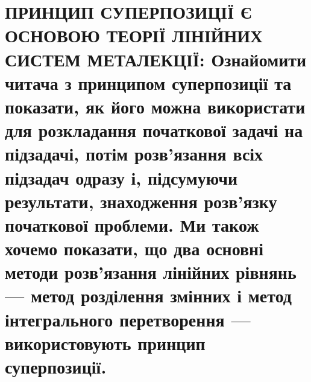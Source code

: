 \documentclass[
  ukrainian,
]{article}
\begin{document}
\section{ПРИНЦИП СУПЕРПОЗИЦІЇ Є ОСНОВОЮ ТЕОРІЇ ЛІНІЙНИХ СИСТЕМ
МЕТАЛЕКЦІЇ: Ознайомити читача з принципом суперпозиції та показати, як
його можна використати для розкладання початкової задачі на підзадачі,
потім розв'язання всіх підзадач одразу і, підсумуючи результати,
знаходження розв'язку початкової проблеми. Ми також хочемо показати, що
два основні методи розв'язання лінійних рівнянь --- метод розділення
змінних і метод інтегрального перетворення --- використовують принцип
суперпозиції.}\label{ux43fux440ux438ux43dux446ux438ux43f-ux441ux443ux43fux435ux440ux43fux43eux437ux438ux446ux456ux457-ux454-ux43eux441ux43dux43eux432ux43eux44e-ux442ux435ux43eux440ux456ux457-ux43bux456ux43dux456ux439ux43dux438ux445-ux441ux438ux441ux442ux435ux43c-ux43cux435ux442ux430ux43bux435ux43aux446ux456ux457-ux43eux437ux43dux430ux439ux43eux43cux438ux442ux438-ux447ux438ux442ux430ux447ux430-ux437-ux43fux440ux438ux43dux446ux438ux43fux43eux43c-ux441ux443ux43fux435ux440ux43fux43eux437ux438ux446ux456ux457-ux442ux430-ux43fux43eux43aux430ux437ux430ux442ux438-ux44fux43a-ux439ux43eux433ux43e-ux43cux43eux436ux43dux430-ux432ux438ux43aux43eux440ux438ux441ux442ux430ux442ux438-ux434ux43bux44f-ux440ux43eux437ux43aux43bux430ux434ux430ux43dux43dux44f-ux43fux43eux447ux430ux442ux43aux43eux432ux43eux457-ux437ux430ux434ux430ux447ux456-ux43dux430-ux43fux456ux434ux437ux430ux434ux430ux447ux456-ux43fux43eux442ux456ux43c-ux440ux43eux437ux432ux44fux437ux430ux43dux43dux44f-ux432ux441ux456ux445-ux43fux456ux434ux437ux430ux434ux430ux447-ux43eux434ux440ux430ux437ux443-ux456-ux43fux456ux434ux441ux443ux43cux443ux44eux447ux438-ux440ux435ux437ux443ux43bux44cux442ux430ux442ux438-ux437ux43dux430ux445ux43eux434ux436ux435ux43dux43dux44f-ux440ux43eux437ux432ux44fux437ux43aux443-ux43fux43eux447ux430ux442ux43aux43eux432ux43eux457-ux43fux440ux43eux431ux43bux435ux43cux438.-ux43cux438-ux442ux430ux43aux43eux436-ux445ux43eux447ux435ux43cux43e-ux43fux43eux43aux430ux437ux430ux442ux438-ux449ux43e-ux434ux432ux430-ux43eux441ux43dux43eux432ux43dux456-ux43cux435ux442ux43eux434ux438-ux440ux43eux437ux432ux44fux437ux430ux43dux43dux44f-ux43bux456ux43dux456ux439ux43dux438ux445-ux440ux456ux432ux43dux44fux43dux44c-ux43cux435ux442ux43eux434-ux440ux43eux437ux434ux456ux43bux435ux43dux43dux44f-ux437ux43cux456ux43dux43dux438ux445-ux456-ux43cux435ux442ux43eux434-ux456ux43dux442ux435ux433ux440ux430ux43bux44cux43dux43eux433ux43e-ux43fux435ux440ux435ux442ux432ux43eux440ux435ux43dux43dux44f-ux432ux438ux43aux43eux440ux438ux441ux442ux43eux432ux443ux44eux442ux44c-ux43fux440ux438ux43dux446ux438ux43f-ux441ux443ux43fux435ux440ux43fux43eux437ux438ux446ux456ux457.}
\end{document}
